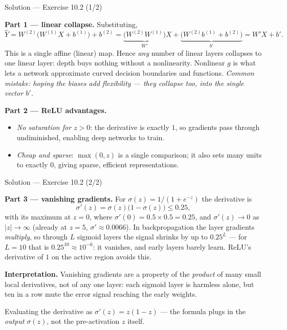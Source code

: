 \documentclass[aspectratio=169,11pt]{beamer}
\begin{document}
\begin{frame}{Solution --- Exercise 10.2 (1/2)}
\begin{solutionbox}
  \textbf{Part 1 --- linear collapse.} Substituting,
  \[
    \hat Y = W^{(2)}\big(W^{(1)} X + b^{(1)}\big) + b^{(2)}
           = \underbrace{\big(W^{(2)} W^{(1)}\big)}_{W'} X
             + \underbrace{\big(W^{(2)} b^{(1)} + b^{(2)}\big)}_{b'}
           = W' X + b' .
  \]
  This is a single affine (linear) map. Hence \emph{any} number of
  linear layers collapses to one linear layer: depth buys nothing
  without a nonlinearity. Nonlinear $g$ is what lets a network
  approximate curved decision boundaries and functions.
  \textit{Common mistake: hoping the biases add flexibility --- they
  collapse too, into the single vector $b'$.}

  \medskip
  \textbf{Part 2 --- ReLU advantages.}
  \begin{itemize}
    \item \emph{No saturation for $z > 0$}: the derivative is exactly
          $1$, so gradients pass through undiminished, enabling deep
          networks to train.
    \item \emph{Cheap and sparse}: $\max(0, z)$ is a single
          comparison; it also sets many units to exactly $0$, giving
          sparse, efficient representations.
  \end{itemize}
\end{solutionbox}
\end{frame}

\begin{frame}{Solution --- Exercise 10.2 (2/2)}
\begin{solutionbox}
  \textbf{Part 3 --- vanishing gradients.} For
  $\sigma(z) = 1/(1 + e^{-z})$ the derivative is
  \[
    \sigma'(z) = \sigma(z)\big(1 - \sigma(z)\big) \le 0.25 ,
  \]
  with its maximum at $z = 0$, where $\sigma'(0) = 0.5 \times 0.5 = 0.25$,
  and $\sigma'(z) \to 0$ as $|z| \to \infty$ (already at $z = 5$,
  $\sigma' \approx 0.0066$). In backpropagation the
  layer gradients \emph{multiply}, so through $L$ sigmoid layers the
  signal shrinks by up to $0.25^{L}$ --- for $L = 10$ that is
  $0.25^{10} \approx 10^{-6}$: it vanishes, and early
  layers barely learn. ReLU's derivative of $1$ on the active region
  avoids this.

  \medskip
  \textbf{Interpretation.} Vanishing gradients are a property of the
  \emph{product} of many small local derivatives, not of any one layer:
  each sigmoid layer is harmless alone, but ten in a row mute the error
  signal reaching the early weights.

\end{solutionbox}
\begin{mistake}
  Evaluating the derivative as $\sigma'(z) = z(1 - z)$ --- the formula plugs in
  the \emph{output} $\sigma(z)$, not the pre-activation $z$ itself.
\end{mistake}
\end{frame}
\end{document}
